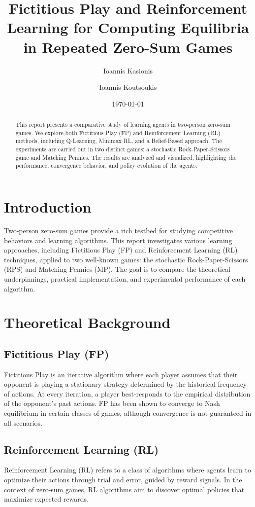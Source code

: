 \documentclass[11pt]{article}
\title{Fictitious Play and Reinforcement Learning for Computing Equilibria in Repeated Zero-Sum Games}
\author{Ioannis Kasionis \and Ioannis Koutsoukis}
\date{\today}
\begin{document}
\maketitle

\begin{abstract}
This report presents a comparative study of learning agents in two-person zero-sum games. We explore both Fictitious Play (FP) and Reinforcement Learning (RL) methods, including Q-Learning, Minimax RL, and a Belief-Based approach. The experiments are carried out in two distinct games: a stochastic Rock-Paper-Scissors game and Matching Pennies. The results are analyzed and visualized, highlighting the performance, convergence behavior, and policy evolution of the agents.
\end{abstract}
    
\section{Introduction}
Two-person zero-sum games provide a rich testbed for studying competitive behaviors and learning algorithms. This report investigates various learning approaches, including Fictitious Play (FP) and Reinforcement Learning (RL) techniques, applied to two well-known games: the stochastic Rock-Paper-Scissors (RPS) and Matching Pennies (MP). The goal is to compare the theoretical underpinnings, practical implementation, and experimental performance of each algorithm.
    
\section{Theoretical Background}
\subsection{Fictitious Play (FP)}
Fictitious Play is an iterative algorithm where each player assumes that their opponent is playing a stationary strategy determined by the historical frequency of actions. At every iteration, a player best-responds to the empirical distribution of the opponent's past actions. FP has been shown to converge to Nash equilibrium in certain classes of games, although convergence is not guaranteed in all scenarios.
    
\subsection{Reinforcement Learning (RL)}
Reinforcement Learning (RL) refers to a class of algorithms where agents learn to optimize their actions through trial and error, guided by reward signals. In the context of zero-sum games, RL algorithms aim to discover optimal policies that maximize expected rewards.
    
\end{document}
